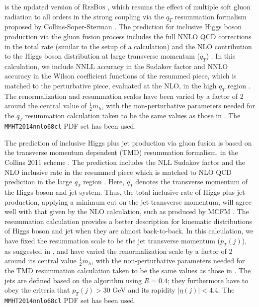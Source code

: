 \subsubsection{\Resbos}
\label{sec:hjetscomp:tools:ares:resbos}

\Resbos is the updated version of \textsc{ResBos} \cite{Balazs:1997xd}, 
which resums the effect of multiple soft gluon radiation to all orders 
in the strong coupling via the $q_T$ resummation formalism proposed by 
Collins-Soper-Sterman \cite{Collins:1984kg}. The \Resbos prediction 
for inclusive Higgs boson production via the gluon fusion process 
includes the full NNLO QCD corrections in the total rate (similar to 
the setup of a \HNNLO calculation) and 
the NLO contribution to the Higgs boson distribution at large transverse 
momentum ($q_T$) \cite{Glosser:2002gm}. In this calculation, we include 
NNLL accuracy in the Sudakov factor and NNLO accuracy in the Wilson coefficient functions 
of the resummed piece, which is matched to the perturbative piece, 
evaluated at the NLO, in the high $q_T$ region \cite{Wang:2012xs}. The 
renormalization and resummation scales have been varied by a factor 
of 2 around the central value of $\tfrac{1}{2}m_h$, with the 
non-perturbative parameters needed for the $q_T$ resummation calculation 
taken to be the same values as those in \cite{Wang:2012xs}. The 
\texttt{MMHT2014nnlo68cl} PDF set has been used.

The \Resbos prediction of inclusive Higgs plus jet production via 
gluon fusion is based on the transverse momentum dependent (TMD) 
resummation formalism, in the Collins 2011 scheme \cite{Collins:2011zzd}.
The prediction includes the NLL Sudakov factor and the NLO inclusive rate in the 
resummed piece which is matched to NLO QCD prediction in the large 
$q_T$ region \cite{Sun:2016kkh}. Here, $q_T$ denotes the transverse 
momentum of the Higgs boson and jet system. Thus, the total 
inclusive rate of Higgs plus jet production, applying a minimum cut on the jet transverse 
momentum, will agree well with that given by the NLO calculation, such 
as produced by MCFM \cite{Campbell:2010ff}. 
The resummation calculation provides a better description for kinematic distributions 
of Higgs boson and jet when they are almost back-to-back. In this 
calculation, we have fixed the resummation scale to be the jet 
transverse momentum ($p_T(j)$), as suggested in \cite{Sun:2016kkh}, 
and have varied the renormalization scale by a factor of 2 around its 
central value $\tfrac{1}{2}m_h$, with the non-perturbative parameters 
needed for the TMD resummation calculation taken to be the same values 
as those in \cite{Sun:2016kkh}. The jets are defined based on the \antikt 
algorithm using $R = 0.4$; they furthermore have to obey the criteria that 
$p_T(j) > 30$ GeV and its rapidity $|\eta(j)| < 4.4$. The 
\texttt{MMHT2014nnlo68cl} PDF set has been used.

